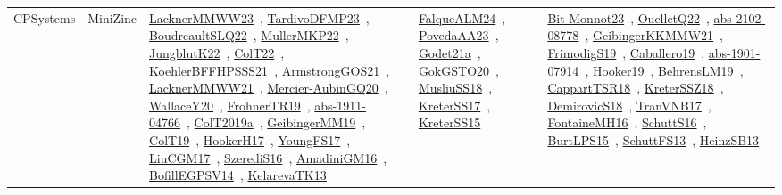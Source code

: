 {\begin{longtable}{lp{3cm}>{\raggedright\arraybackslash}p{6cm}>{\raggedright\arraybackslash}p{6cm}>{\raggedright\arraybackslash}p{8cm}}
CPSystems & MiniZinc & \href{../works/LacknerMMWW23.pdf}{LacknerMMWW23}~\cite{LacknerMMWW23}, \href{../works/TardivoDFMP23.pdf}{TardivoDFMP23}~\cite{TardivoDFMP23}, \href{../works/BoudreaultSLQ22.pdf}{BoudreaultSLQ22}~\cite{BoudreaultSLQ22}, \href{../works/MullerMKP22.pdf}{MullerMKP22}~\cite{MullerMKP22}, \href{../works/JungblutK22.pdf}{JungblutK22}~\cite{JungblutK22}, \href{../works/ColT22.pdf}{ColT22}~\cite{ColT22}, \href{../works/KoehlerBFFHPSSS21.pdf}{KoehlerBFFHPSSS21}~\cite{KoehlerBFFHPSSS21}, \href{../works/ArmstrongGOS21.pdf}{ArmstrongGOS21}~\cite{ArmstrongGOS21}, \href{../works/LacknerMMWW21.pdf}{LacknerMMWW21}~\cite{LacknerMMWW21}, \href{../works/Mercier-AubinGQ20.pdf}{Mercier-AubinGQ20}~\cite{Mercier-AubinGQ20}, \href{../works/WallaceY20.pdf}{WallaceY20}~\cite{WallaceY20}, \href{../works/FrohnerTR19.pdf}{FrohnerTR19}~\cite{FrohnerTR19}, \href{../works/abs-1911-04766.pdf}{abs-1911-04766}~\cite{abs-1911-04766}, \href{../works/ColT2019a.pdf}{ColT2019a}~\cite{ColT2019a}, \href{../works/GeibingerMM19.pdf}{GeibingerMM19}~\cite{GeibingerMM19}, \href{../works/ColT19.pdf}{ColT19}~\cite{ColT19}, \href{../works/HookerH17.pdf}{HookerH17}~\cite{HookerH17}, \href{../works/YoungFS17.pdf}{YoungFS17}~\cite{YoungFS17}, \href{../works/LiuCGM17.pdf}{LiuCGM17}~\cite{LiuCGM17}, \href{../works/SzerediS16.pdf}{SzerediS16}~\cite{SzerediS16}, \href{../works/AmadiniGM16.pdf}{AmadiniGM16}~\cite{AmadiniGM16}, \href{../works/BofillEGPSV14.pdf}{BofillEGPSV14}~\cite{BofillEGPSV14}, \href{../works/KelarevaTK13.pdf}{KelarevaTK13}~\cite{KelarevaTK13} & \href{../works/FalqueALM24.pdf}{FalqueALM24}~\cite{FalqueALM24}, \href{../works/PovedaAA23.pdf}{PovedaAA23}~\cite{PovedaAA23}, \href{../works/Godet21a.pdf}{Godet21a}~\cite{Godet21a}, \href{../works/GokGSTO20.pdf}{GokGSTO20}~\cite{GokGSTO20}, \href{../works/MusliuSS18.pdf}{MusliuSS18}~\cite{MusliuSS18}, \href{../works/KreterSS17.pdf}{KreterSS17}~\cite{KreterSS17}, \href{../works/KreterSS15.pdf}{KreterSS15}~\cite{KreterSS15} & \href{../works/Bit-Monnot23.pdf}{Bit-Monnot23}~\cite{Bit-Monnot23}, \href{../works/OuelletQ22.pdf}{OuelletQ22}~\cite{OuelletQ22}, \href{../works/abs-2102-08778.pdf}{abs-2102-08778}~\cite{abs-2102-08778}, \href{../works/GeibingerKKMMW21.pdf}{GeibingerKKMMW21}~\cite{GeibingerKKMMW21}, \href{../works/FrimodigS19.pdf}{FrimodigS19}~\cite{FrimodigS19}, \href{../works/Caballero19.pdf}{Caballero19}~\cite{Caballero19}, \href{../works/abs-1901-07914.pdf}{abs-1901-07914}~\cite{abs-1901-07914}, \href{../works/Hooker19.pdf}{Hooker19}~\cite{Hooker19}, \href{../works/BehrensLM19.pdf}{BehrensLM19}~\cite{BehrensLM19}, \href{../works/CappartTSR18.pdf}{CappartTSR18}~\cite{CappartTSR18}, \href{../works/KreterSSZ18.pdf}{KreterSSZ18}~\cite{KreterSSZ18}, \href{../works/DemirovicS18.pdf}{DemirovicS18}~\cite{DemirovicS18}, \href{../works/TranVNB17.pdf}{TranVNB17}~\cite{TranVNB17}, \href{../works/FontaineMH16.pdf}{FontaineMH16}~\cite{FontaineMH16}, \href{../works/SchuttS16.pdf}{SchuttS16}~\cite{SchuttS16}, \href{../works/BurtLPS15.pdf}{BurtLPS15}~\cite{BurtLPS15}, \href{../works/SchuttFS13.pdf}{SchuttFS13}~\cite{SchuttFS13}, \href{../works/HeinzSB13.pdf}{HeinzSB13}~\cite{HeinzSB13}\\

\end{longtable}}
